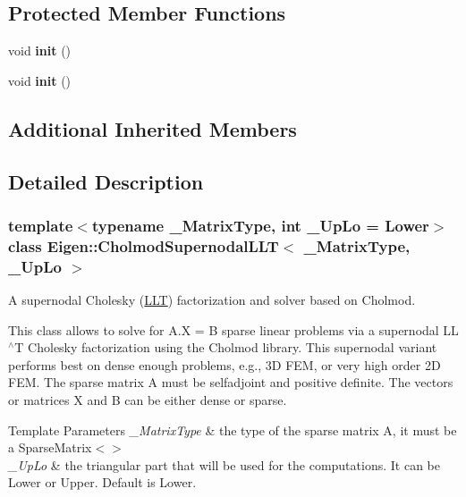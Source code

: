 \subsection*{Protected Member Functions}
\begin{DoxyCompactItemize}
\item 
\mbox{\label{class_eigen_1_1_cholmod_supernodal_l_l_t_a06172bfd8b6408d1291246c0535e1684}} 
void {\bfseries init} ()
\item 
\mbox{\label{class_eigen_1_1_cholmod_supernodal_l_l_t_a06172bfd8b6408d1291246c0535e1684}} 
void {\bfseries init} ()
\end{DoxyCompactItemize}
\subsection*{Additional Inherited Members}


\subsection{Detailed Description}
\subsubsection*{template$<$typename \+\_\+\+Matrix\+Type, int \+\_\+\+Up\+Lo = Lower$>$\newline
class Eigen\+::\+Cholmod\+Supernodal\+L\+L\+T$<$ \+\_\+\+Matrix\+Type, \+\_\+\+Up\+Lo $>$}

A supernodal Cholesky (\hyperlink{group___cholesky___module_class_eigen_1_1_l_l_t}{L\+LT}) factorization and solver based on Cholmod. 

This class allows to solve for A.\+X = B sparse linear problems via a supernodal L\+L$^\wedge$T Cholesky factorization using the Cholmod library. This supernodal variant performs best on dense enough problems, e.\+g., 3D F\+EM, or very high order 2D F\+EM. The sparse matrix A must be selfadjoint and positive definite. The vectors or matrices X and B can be either dense or sparse.


\begin{DoxyTemplParams}{Template Parameters}
{\em \+\_\+\+Matrix\+Type} & the type of the sparse matrix A, it must be a Sparse\+Matrix$<$$>$ \\
\hline
{\em \+\_\+\+Up\+Lo} & the triangular part that will be used for the computations. It can be Lower or Upper. Default is Lower.\\
\hline
\end{DoxyTemplParams}


